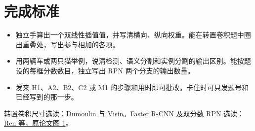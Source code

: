 \documentclass[UTF8,a4paper,11pt]{ctexart}
\begin{document}
\section{完成标准}
\begin{itemize}
\item 独立手算出一个双线性插值值，并写清横向、纵向权重。能在转置卷积题中圈出重叠处，写出参与相加的各项。
\item 用两辆车或两只猫举例，说清检测、语义分割和实例分割的输出区别。能按题设的每框分数数目，独立写出 RPN 两个分支的输出数量。
\item 发来 H1、A2、B2、C2 或 M1 的步骤和用时即可批改。卡住时可只发题号和已经写到的那一步。
\end{itemize}
转置卷积尺寸选读：\href{https://arxiv.org/abs/1603.07285}{Dumoulin 与 Visin}。Faster R-CNN 及双分数 RPN 选读：\href{https://proceedings.neurips.cc/paper/2015/file/14bfa6bb14875e45bba028a21ed38046-Paper.pdf}{Ren 等，原论文图 1}。
\end{document}
